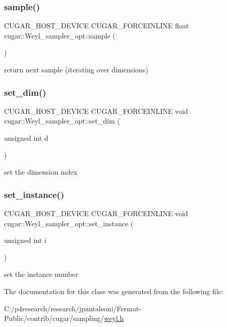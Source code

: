\subsubsection{\texorpdfstring{sample()}{sample()}}
{\footnotesize\ttfamily C\+U\+G\+A\+R\+\_\+\+H\+O\+S\+T\+\_\+\+D\+E\+V\+I\+CE C\+U\+G\+A\+R\+\_\+\+F\+O\+R\+C\+E\+I\+N\+L\+I\+NE float cugar\+::\+Weyl\+\_\+sampler\+\_\+opt\+::sample (\begin{DoxyParamCaption}{ }\end{DoxyParamCaption})\hspace{0.3cm}{\ttfamily [inline]}}

return next sample (iterating over dimensions) \mbox{\label{classcugar_1_1_weyl__sampler__opt_a1120c5c45ac2dec8669de86767eaca08}} 
\subsubsection{\texorpdfstring{set\+\_\+dim()}{set\_dim()}}
{\footnotesize\ttfamily C\+U\+G\+A\+R\+\_\+\+H\+O\+S\+T\+\_\+\+D\+E\+V\+I\+CE C\+U\+G\+A\+R\+\_\+\+F\+O\+R\+C\+E\+I\+N\+L\+I\+NE void cugar\+::\+Weyl\+\_\+sampler\+\_\+opt\+::set\+\_\+dim (\begin{DoxyParamCaption}\item[{unsigned int}]{d }\end{DoxyParamCaption})\hspace{0.3cm}{\ttfamily [inline]}}

set the dimension index \mbox{\label{classcugar_1_1_weyl__sampler__opt_ab6248f98d32ea51e4b7f803474bb05e3}} 
\subsubsection{\texorpdfstring{set\+\_\+instance()}{set\_instance()}}
{\footnotesize\ttfamily C\+U\+G\+A\+R\+\_\+\+H\+O\+S\+T\+\_\+\+D\+E\+V\+I\+CE C\+U\+G\+A\+R\+\_\+\+F\+O\+R\+C\+E\+I\+N\+L\+I\+NE void cugar\+::\+Weyl\+\_\+sampler\+\_\+opt\+::set\+\_\+instance (\begin{DoxyParamCaption}\item[{unsigned int}]{i }\end{DoxyParamCaption})\hspace{0.3cm}{\ttfamily [inline]}}

set the instance number 

The documentation for this class was generated from the following file\+:\begin{DoxyCompactItemize}
\item 
C\+:/p4research/research/jpantaleoni/\+Fermat-\/\+Public/contrib/cugar/sampling/\hyperlink{weyl_8h}{weyl.\+h}\end{DoxyCompactItemize}
